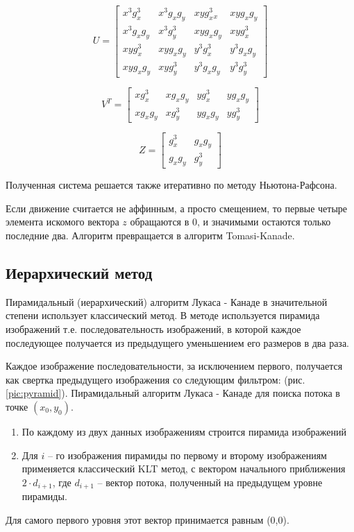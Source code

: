 $$U=\begin{bmatrix}
x^3g^3_x & x^3g_xg_y & xyg^3_x_x & xyg_xg_y \\
x^3g_xg_y & x^3g^3_y & xyg_xg_y & xyg^3_x \\
xyg^3_x & xyg_xg_y & y^3g^3_x & y^3g_xg_y \\
xyg_xg_y & xyg^3_y & y^3g_xg_y & y^3g^3_y
\end{bmatrix}$$

$$V^T=\begin{bmatrix}
xg^3_x & xg_xg_y & yg^3_x & yg_xg_y \\
xg_xg_y & xg^3_y & yg_xg_y & yg^3_y
\end{bmatrix}$$

$$Z=\begin{bmatrix}
g^3_x & g_xg_y \\
g_xg_y & g^3_y
\end{bmatrix}$$

Полученная система решается также итеративно по методу Ньютона-Рафсона.

Если движение считается не аффинным, а просто смещением, то первые четыре элемента искомого вектора $z$ обращаются в 0, и значимыми остаются только последние два. Алгоритм превращается в алгоритм Tomasi-Kanade.

\subsection{Иерархический метод}
Пирамидальный (иерархический) алгоритм Лукаса - Канаде в значительной степени использует классический метод. В методе используется пирамида изображений т.е. последовательность изображений, в которой каждое последующее получается из предыдущего уменьшением его размеров в два раза.

Каждое изображение последовательности, за исключением первого, получается как свертка предыдущего изображения со следующим фильтром:
(рис. \ref{pic:pyramid}).
Пирамидальный алгоритм Лукаса - Канаде для поиска потока в точке $(x_0,y_0)$.
\begin{enumerate}
\item По каждому из двух данных изображениям строится пирамида изображений
\item Для $i$ – го изображения пирамиды по первому и второму изображениям применяется классический KLT метод, с вектором начального приближения $2 \cdot d_{i+1}$, где $d_{i+1}$ – вектор потока, полученный на предыдущем уровне пирамиды.
\end{enumerate}
Для самого первого уровня этот вектор принимается равным (0,0).

